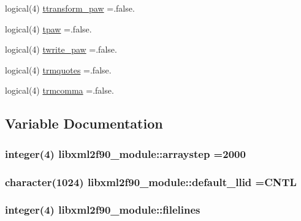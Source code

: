 \begin{DoxyCompactItemize}
\item 
logical(4) \hyperlink{namespacelibxml2f90__module_a57a7bbf9cf74f527371bfb5496135bdf}{ttransform\+\_\+paw} =.false.
\item 
logical(4) \hyperlink{namespacelibxml2f90__module_aaa46bc31e8406d83b035ff8b620563a8}{tpaw} =.false.
\item 
logical(4) \hyperlink{namespacelibxml2f90__module_aaba636a60c116ce3dfa158403414d3b1}{twrite\+\_\+paw} =.false.
\item 
logical(4) \hyperlink{namespacelibxml2f90__module_aa7358595240bdca537fc1e126fb8f6a8}{trmquotes} =.false.
\item 
logical(4) \hyperlink{namespacelibxml2f90__module_a01eddf97a14bcc393835cd086f78dfdf}{trmcomma} =.false.
\end{DoxyCompactItemize}


\subsection{Variable Documentation}
\hypertarget{namespacelibxml2f90__module_a03a53e403791ec1e112a71f5f2831522}{}
\subsubsection[{arraystep}]{\setlength{\rightskip}{0pt plus 5cm}integer(4) libxml2f90\+\_\+module\+::arraystep =2000}\label{namespacelibxml2f90__module_a03a53e403791ec1e112a71f5f2831522}
\hypertarget{namespacelibxml2f90__module_a2dc8e61fe0a8b9c60b5197984e7b30ae}{}
\subsubsection[{default\+\_\+llid}]{\setlength{\rightskip}{0pt plus 5cm}character(1024) libxml2f90\+\_\+module\+::default\+\_\+llid =\textquotesingle{}C\+N\+T\+L\textquotesingle{}}\label{namespacelibxml2f90__module_a2dc8e61fe0a8b9c60b5197984e7b30ae}
\hypertarget{namespacelibxml2f90__module_a63c8792c8a009d1875c66340984b0879}{}
\subsubsection[{filelines}]{\setlength{\rightskip}{0pt plus 5cm}integer(4) libxml2f90\+\_\+module\+::filelines}\label{namespacelibxml2f90__module_a63c8792c8a009d1875c66340984b0879}
\hypertarget{namespacelibxml2f90__module_aef9ff21f71177c723fbac94eeafcb733}{}
